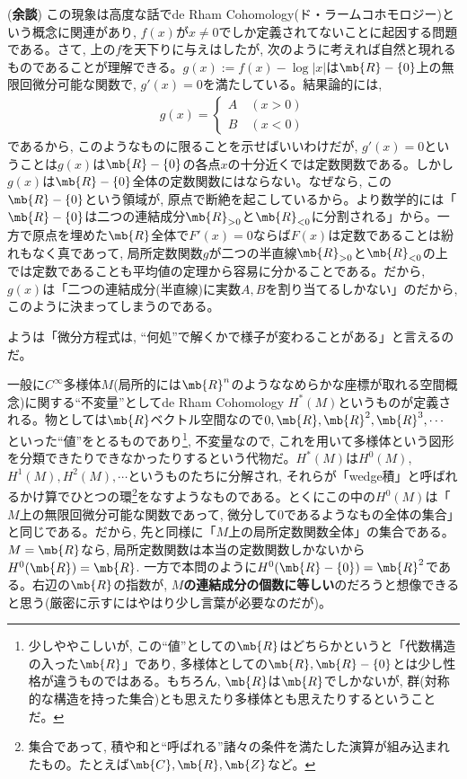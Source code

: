 (\textbf{余談}) この現象は高度な話でde Rham Cohomology(ド・ラームコホモロジー)という概念に関連があり, $f(x)$が$x\neq 0$でしか定義されてないことに起因する問題である。さて, 上の$f$を天下りに与えはしたが, 次のように考えれば自然と現れるものであることが理解できる。$g(x) := f(x) - \log{|x|}$は$\mb{R}-\{ 0 \}$上の無限回微分可能な関数で, $g'(x) = 0$を満たしている。結果論的には, 
\begin{align*}
 g(x)=\left\{
 \begin{aligned}
  A \quad (x>0) \\
  B \quad (x<0)
 \end{aligned}
 \right.
\end{align*}
であるから, このようなものに限ることを示せばいいわけだが, $g'(x) = 0$ということは$g(x)$は$\mb{R}-\{ 0 \}$の各点$x$の十分近くでは定数関数である。しかし$g(x)$は$\mb{R} - \{ 0 \}$全体の定数関数にはならない。なぜなら, この$\mb{R} - \{ 0 \}$という領域が, 原点で断絶を起こしているから。より数学的には「$\mb{R} - \{ 0 \}$は二つの連結成分$\mb{R}_{>0}$と$\mb{R}_{<0}$に分割される」から。一方で原点を埋めた$\mb{R}$全体で$F'(x) = 0$ならば$F(x)$は定数であることは紛れもなく真であって, 局所定数関数$g$が二つの半直線$\mb{R}_{>0}$と$\mb{R}_{<0}$の上では定数であることも平均値の定理から容易に分かることである。だから, $g(x)$は「二つの連結成分(半直線)に実数$A,B$を割り当てるしかない」のだから, このように決まってしまうのである。

ようは「微分方程式は, ``何処''で解くかで様子が変わることがある」と言えるのだ。

一般に$C^{\infty}$多様体$M$(局所的には$\mb{R}^{n}$のようななめらかな座標が取れる空間概念)に関する``不変量''としてde Rham Cohomology $H^{\ast}(M)$というものが定義される。物としては$\mb{R}$ベクトル空間なので$0,\mb{R},\mb{R}^2,\mb{R}^3,\cdots$といった``値''をとるものであり\footnote{少しややこしいが, この``値''としての$\mb{R}$はどちらかというと「代数構造の入った$\mb{R}$」であり, 多様体としての$\mb{R}, \mb{R}-\{ 0 \}$とは少し性格が違うものではある。もちろん, $\mb{R}$は$\mb{R}$でしかないが, 群(対称的な構造を持った集合)とも思えたり多様体とも思えたりするということだ。}, 不変量なので, これを用いて多様体という図形を分類できたりできなかったりするという代物だ。$H^{\ast}(M)$は$H^{0}(M)$, $H^{1}(M),H^{2}(M),\cdots$というものたちに分解され, それらが「wedge積」と呼ばれるかけ算でひとつの環\footnote{集合であって, 積や和と``呼ばれる''諸々の条件を満たした演算が組み込まれたもの。たとえば$\mb{C},\mb{R},\mb{Z}$など。}をなすようなものである。とくにこの中の$H^{0}(M)$は「$M$上の無限回微分可能な関数であって, 微分して$0$であるようなもの全体の集合」と同じである。だから, 先と同様に「$M$上の局所定数関数全体」の集合である。$M=\mb{R}$なら, 局所定数関数は本当の定数関数しかないから$H^{0}(\mb{R}) = \mb{R}$.  一方で本問のように$H^{0}(\mb{R}-\{ 0 \}) = \mb{R}^2$である。右辺の$\mb{R}$の指数が, \textbf{$M$の連結成分の個数に等しい}のだろうと想像できると思う(厳密に示すにはやはり少し言葉が必要なのだが)。

